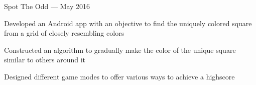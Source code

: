 \begin{cventries}

\cventryalt
{Spot The Odd --- } %
{May 2016} %
{ %
\begin{cvitems}
\item {Developed an Android app with an objective to find the uniquely colored square from a grid of closely resembling colors}
\item {Constructed an algorithm to gradually make the color of the unique square similar to others around it}
\item {Designed different game modes to offer various ways to achieve a highscore}
\end{cvitems}
}


\end{cventries}